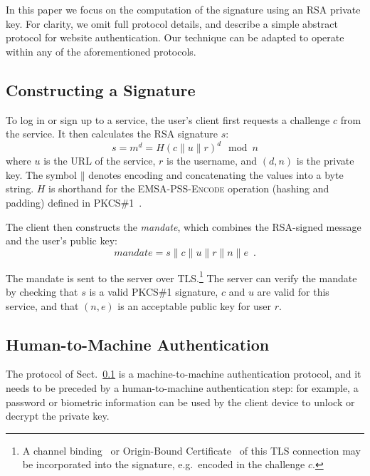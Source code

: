\documentclass{llncs}
\newcommand*{\concat}{\mathbin{\|}}
\begin{document}
In this paper we focus on the computation of the signature using an RSA private key. For clarity, we
omit full protocol details, and describe a simple abstract protocol for website authentication. Our
technique can be adapted to operate within any of the aforementioned protocols.

\subsection{Constructing a Signature}\label{sec:mandate}

To log in or sign up to a service, the user's client first requests a challenge $c$ from the
service. It then calculates the RSA signature $s$:
\begin{equation}
s = m^d = H(c \concat u \concat r)^d \mod n
\end{equation}
where $u$ is the URL of the service, $r$ is the username, and $(d, n)$ is the private key. The
symbol $\concat$ denotes encoding and concatenating the values into a byte string. $H$ is shorthand
for the \textsc{EMSA-PSS-Encode} operation (hashing and padding) defined in PKCS\#1~\cite{PKCS1}.

The client then constructs the \emph{mandate}, which combines the RSA-signed message and the user's
public key:
\begin{equation}
\mathit{mandate} = s \concat c \concat u \concat r \concat n \concat e \enspace.
\end{equation}

The mandate is sent to the server over TLS.\footnote{A channel binding~\cite{ChannelBinding} or
Origin-Bound Certificate~\cite{Dietz12} of this TLS connection may be incorporated into the
signature, e.g.\ encoded in the challenge $c$.} The server can verify the mandate by checking that
$s$ is a valid PKCS\#1 signature, $c$ and $u$ are valid for this service, and that $(n, e)$ is an
acceptable public key for user $r$.

\subsection{Human-to-Machine Authentication}\label{sec:human-to-machine}

The protocol of Sect.~\ref{sec:mandate} is a machine-to-machine authentication protocol, and it
needs to be preceded by a human-to-machine authentication step: for example, a password or biometric
information can be used by the client device to unlock or decrypt the private key.
\end{document}
